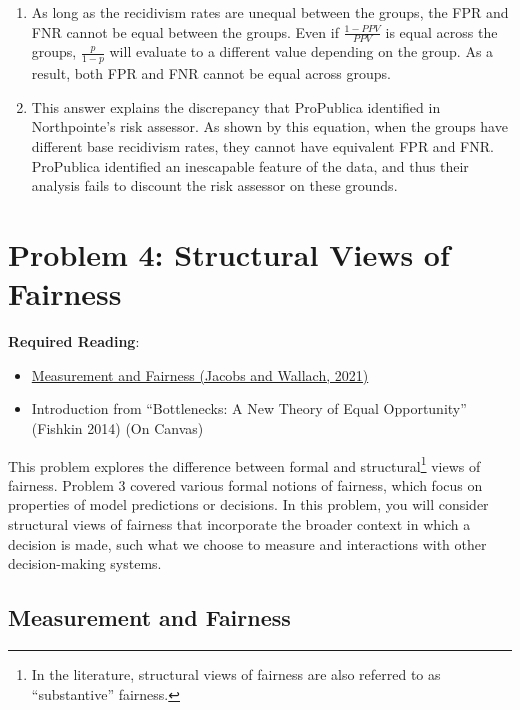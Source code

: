 \documentclass{article}
\begin{document}
\bigskip
\begin{mdframed}
\begin{enumerate}[label=\Alph*.]
\item As long as the recidivism rates are unequal between the groups, the FPR and FNR cannot be equal between the groups. Even if $\frac{1-PPV}{PPV}$ is equal across the groups, $\frac{p}{1-p}$ will evaluate to a different value depending on the group. As a result, both FPR and FNR cannot be equal across groups.
\item This answer explains the discrepancy that ProPublica identified in Northpointe's risk assessor. As shown by this equation, when the groups have different base recidivism rates, they cannot have equivalent FPR and FNR. ProPublica identified an inescapable feature of the data, and thus their analysis fails to discount the risk assessor on these grounds.
\end{enumerate}
\end{mdframed}

\bigskip


\clearpage
\section*{Problem 4: Structural Views of Fairness}

\textbf{Required Reading}:
\begin{itemize}
    \item \href{https://arxiv.org/pdf/1912.05511}{Measurement and Fairness (Jacobs and Wallach, 2021)}
    \item Introduction from ``Bottlenecks: A New Theory of Equal Opportunity'' (Fishkin 2014) (On Canvas)
\end{itemize}

This problem explores the difference between formal and structural\footnote{In the literature, structural views of fairness are also referred to as ``substantive'' fairness.} views of fairness. Problem 3 covered various formal notions of fairness, which focus on properties of model predictions or decisions. In this problem, you will consider structural views of fairness that incorporate the broader context in which a decision is made, such what we choose to measure and interactions with other decision-making systems.

\subsection*{Measurement and Fairness}
\end{document}
